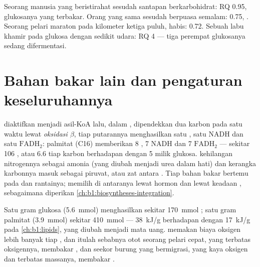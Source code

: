 \begin{example}\label{ex:b1:respiration-fermentation:readrq}
Seorang manusia yang beristirahat sesudah santapan berkarbohidrat: RQ
0.95, glukosanya yang terbakar. Orang yang sama sesudah berpuasa
semalam: 0.75, . Seorang pelari maraton pada kilometer ketiga
puluh,  habis: 0.72. Sebuah labu khamir pada glukosa dengan
sedikit udara: RQ 4 --- tiga perempat glukosanya sedang difermentasi.
\end{example}

\section{Bahan bakar lain dan pengaturan keseluruhannya}

\begin{proposition}\label{prop:b1:respiration-fermentation:otherfuels}
 diaktifkan menjadi asil-KoA lalu, dalam , dipendekkan dua karbon pada satu waktu lewat \emph{oksidasi
$\beta$}, tiap putarannya menghasilkan satu , satu NADH dan
satu $\mathrm{FADH_2}$: palmitat (C16) memberikan 8 , 7 NADH
dan 7 $\mathrm{FADH_2}$ --- sekitar 106 , atau \qty{6.6}{}  tiap
karbon berhadapan dengan 5 milik glukosa.  kehilangan
nitrogennya sebagai amonia (yang diubah menjadi urea dalam hati) dan
kerangka karbonnya masuk sebagai piruvat,  atau zat antara
. Tiap bahan bakar bertemu pada  dan rantainya;
 memilih di antaranya lewat hormon dan lewat keadaan ,
sebagaimana diperikan \cref{ch:b1:biosyntheses-integration}.
\end{proposition}

\begin{example}\label{ex:b1:respiration-fermentation:gramofeach}
Satu gram glukosa (\qty{5.6}{mmol}) menghasilkan sekitar
\qty{170}{mmol} ; satu gram palmitat (\qty{3.9}{mmol}) sekitar
\qty{410}{mmol} --- \qty{38}{kJ/g} berhadapan dengan \qty{17}{kJ/g}
pada \cref{ch:b1:lipids}, yang diubah menjadi mata uang. 
memakan biaya oksigen lebih banyak tiap , dan itulah sebabnya otot
seorang pelari cepat, yang terbatas oksigennya, membakar , dan
seekor burung yang bermigrasi, yang kaya oksigen dan terbatas massanya,
membakar .
\end{example}

